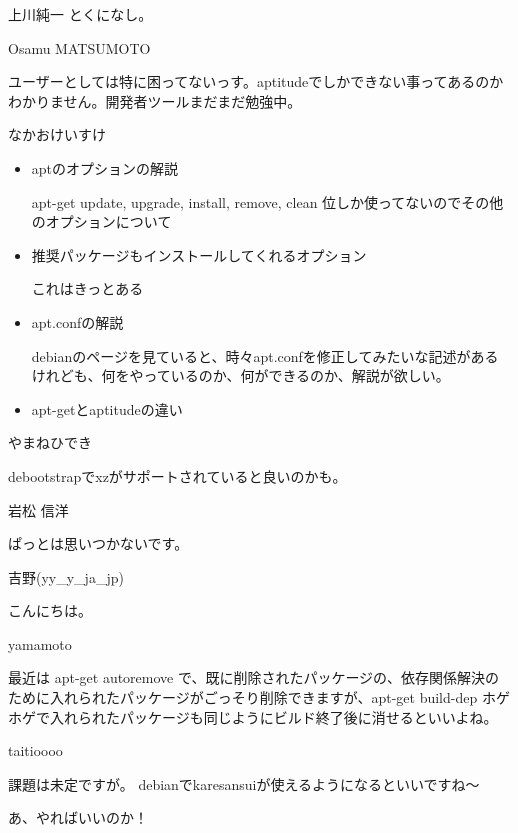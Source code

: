 \begin{prework}{ 上川純一 }
とくになし。

\end{prework}

\begin{prework}{ Osamu MATSUMOTO }

ユーザーとしては特に困ってないっす。aptitudeでしかできない事ってあるのかわかりません。開発者ツールまだまだ勉強中。
\end{prework}

\begin{prework}{ なかおけいすけ }

\begin{itemize}
\item aptのオプションの解説

apt-get update, upgrade, install, remove, clean 位しか使ってないのでその他のオプションについて

\item 推奨パッケージもインストールしてくれるオプション

これはきっとある

\item apt.confの解説

debianのページを見ていると、時々apt.confを修正してみたいな記述があるけれども、何をやっているのか、何ができるのか、解説が欲しい。

\item apt-getとaptitudeの違い
\end{itemize}

\end{prework}

\begin{prework}{ やまねひでき }

debootstrapでxzがサポートされていると良いのかも。
\end{prework}

\begin{prework}{ 岩松 信洋 }

ぱっとは思いつかないです。
\end{prework}

\begin{prework}{ 吉野(yy\_y\_ja\_jp) }

こんにちは。
\end{prework}

\begin{prework}{ yamamoto }

最近は apt-get autoremove で、既に削除されたパッケージの、依存関係解決のために入れられたパッケージがごっそり削除できますが、apt-get build-dep ホゲホゲで入れられたパッケージも同じようにビルド終了後に消せるといいよね。
\end{prework}

\begin{prework}{ taitioooo }

課題は未定ですが。
debianでkaresansuiが使えるようになるといいですね〜

あ、やればいいのか！
\end{prework}
